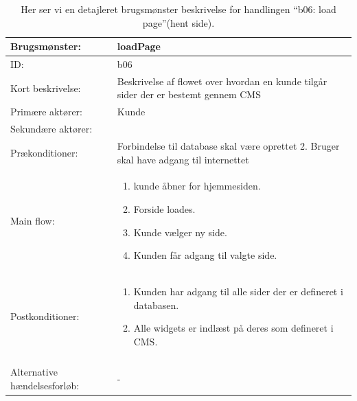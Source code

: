 \begin{table}[H]
    \begin{tabular}{|p{5cm}|p{10cm}|}
        \hline
        Brugsmønster: & loadPage \\ 
        \hline
        ID: & b06 \\ 
        \hline
        Kort beskrivelse: & Beskrivelse af flowet over hvordan en kunde tilgår sider der er bestemt gennem CMS \\ 
        \hline
        Primære aktører: & Kunde \\ 
        \hline
        Sekundære aktører: & \\ 
        \hline
        Prækonditioner: & Forbindelse til database skal være oprettet
2.  	Bruger skal have adgang til internettet \\ 
        \hline
        Main flow: &    
        \begin{minipage}{10cm}
                \begin{enumerate}
                    \item kunde åbner for hjemmesiden.
                    \item Forside loades.
                    \item Kunde vælger ny side.
                    \item Kunden får adgang til valgte side.
        \end{enumerate}
        \end{minipage} \par \\

        \hline
        Postkonditioner: & 
        	\begin{minipage}{10cm}
                \begin{enumerate}
                    \item Kunden har adgang til alle sider der er defineret i databasen.
                    \item Alle widgets er indlæst på deres som defineret i CMS.
        		\end{enumerate}
        \end{minipage} \par \\ \\ 
        \hline
        Alternative hændelsesforløb: & - \\ 
        \hline
    \end{tabular}
    \caption{Her ser vi en detajleret brugsmønster beskrivelse for handlingen “b06: load page”(hent side).}
    \label{Elab:UC-OpdatereSide}
\end{table}

